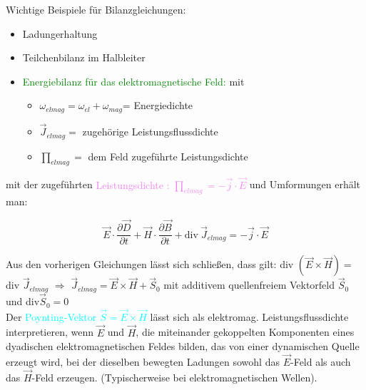 \documentclass[]{article}
\begin{document}
	Wichtige Beispiele für Bilanzgleichungen:
	
	\begin{itemize}
		\item 
			Ladungerhaltung
		\item 
			Teilchenbilanz im Halbleiter
		\item 
			\textcolor{green}{Energiebilanz für das elektromagnetische Feld: } mit 
		
		\begin{itemize}
			\item 
				$\omega_{elmag}=\omega_{el}+\omega_{mag}$= Energiedichte
			\item 
				$\vec{J}_{elmag}=$ zugehörige Leistungsflussdichte
			\item 
				$\prod_{elmag}=$ dem Feld zugeführte Leistungsdichte
		\end{itemize} 
	\end{itemize}

\newpage

 	mit der zugeführten \textcolor{violet}{Leistungsdichte : $		\prod_{elmag}=-\vec{j}\cdot \vec{E}$} und  Umformungen 		erhält man:
	
	\begin{center}
		\begin{boxedminipage}[magenta]{8cm}
			\begin{displaymath} 
				\vec{E}\cdot \frac{\partial \vec{D}}{\partial t}+\vec{H}\cdot \frac{\partial \vec{B}}{\partial t}+ \text{div} \ \vec{J}_{elmag}=-\vec{j}\cdot \vec{E}
			\end{displaymath}
		\end{boxedminipage}
	\end{center}
	
	Aus den vorherigen Gleichungen lässt sich schließen, dass gilt: div $(\vec{E}\times \vec{H})=$ div $\vec{J}_{elmag}$
	$\Rightarrow$ $\vec{J}_{elmag}=\vec{E}\times \vec{H}+\vec{S}_0$ mit additivem quellenfreiem Vektorfeld $\vec{S}_0$ und div$\vec{S}_0=0$
	\\Der \textcolor{cyan}{Poynting-Vektor $\vec{S}=\vec{E}\times \vec{H}$} lässt sich als elektromag. Leistungsflussdichte interpretieren, wenn $\vec{E}$ und $\vec{H}$, die miteinander gekoppelten Komponenten eines dyadischen elektromagnetischen Feldes bilden, das von einer dynamischen Quelle erzeugt wird, bei der dieselben bewegten Ladungen sowohl das $\vec{E}$-Feld als auch das  $\vec{H}$-Feld erzeugen. (Typischerweise bei elektromagnetischen Wellen).
\end{document}
